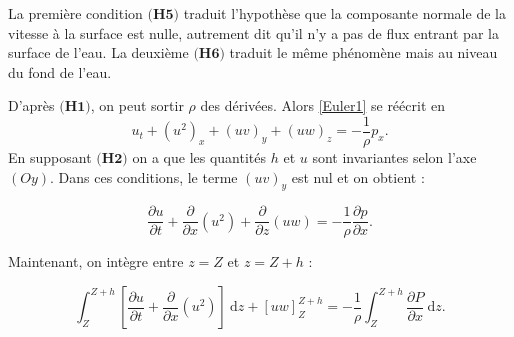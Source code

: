 \documentclass[
11pt, %
francais, %
singlespacing, %
headsepline, %
]{MastersDoctoralThesis} %
\theoremstyle{definition}
\begin{document}
La première condition $\textbf{(H5)}$ traduit l'hypothèse que la composante normale de la vitesse à la surface est nulle, autrement dit qu'il n'y a pas de flux entrant par la surface de l'eau. La deuxième $\textbf{(H6)}$ traduit le même phénomène mais au niveau du fond de l'eau.

D'après $\textbf{(H1)}$, on peut sortir $\rho$ des dérivées. Alors \eqref{Euler1} se réécrit en 
\begin{equation} u_{t} + (u^{2})_{x}+(uv)_{y}+(uw)_{z} =-\frac{1}{\rho}p_{x}. \label{dvpt2}\end{equation}
En supposant  $\textbf{(H2)}$ on a que les quantités $h$ et $u$ sont invariantes selon l'axe $(Oy)$. Dans ces conditions, le terme $(uv)_{y}$ est nul et on obtient :




\begin{equation}
\frac{\partial u}{\partial t}+\frac{\partial}{\partial x} (u^{2})+\frac{\partial }{\partial z}(uw)=-\frac{1}{\rho}\frac{\partial p}{\partial x}.
\end{equation}

Maintenant, on intègre entre $z=Z$ et $z=Z+h$ :

\begin{equation}
\int_{Z}^{Z+h}\left[\frac{\partial u}{\partial t}+\frac{\partial }{\partial x}(u^{2})\right]~\mathrm dz+\left[uw\right]_{Z}^{Z+h}=-\frac{1}{\rho}\int_{Z}^{Z+h}\frac{\partial P}{\partial x}~\mathrm dz. \label{EqInt}
\end{equation}
\end{document}
